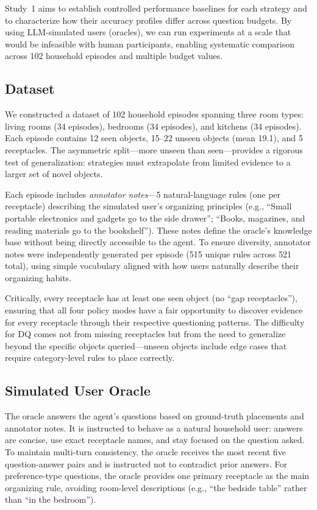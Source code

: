 \documentclass[a4paper,fleqn]{cas-sc}
\begin{document}
Study~1 aims to establish controlled performance baselines for each strategy and to characterize how their accuracy profiles differ across question budgets. By using LLM-simulated users (oracles), we can run experiments at a scale that would be infeasible with human participants, enabling systematic comparison across 102 household episodes and multiple budget values.

\subsection{Dataset}

We constructed a dataset of 102 household episodes spanning three room types: living rooms (34 episodes), bedrooms (34 episodes), and kitchens (34 episodes). Each episode contains 12 seen objects, 15--22 unseen objects (mean 19.1), and 5 receptacles. The asymmetric split---more unseen than seen---provides a rigorous test of generalization: strategies must extrapolate from limited evidence to a larger set of novel objects.

Each episode includes \emph{annotator notes}---5 natural-language rules (one per receptacle) describing the simulated user's organizing principles (e.g., ``Small portable electronics and gadgets go to the side drawer''; ``Books, magazines, and reading materials go to the bookshelf''). These notes define the oracle's knowledge base without being directly accessible to the agent. To ensure diversity, annotator notes were independently generated per episode (515 unique rules across 521 total), using simple vocabulary aligned with how users naturally describe their organizing habits.

Critically, every receptacle has at least one seen object (no ``gap receptacles''), ensuring that all four policy modes have a fair opportunity to discover evidence for every receptacle through their respective questioning patterns. The difficulty for DQ comes not from missing receptacles but from the need to generalize beyond the specific objects queried---unseen objects include edge cases that require category-level rules to place correctly.

\subsection{Simulated User Oracle}

The oracle answers the agent's questions based on ground-truth placements and annotator notes. It is instructed to behave as a natural household user: answers are concise, use exact receptacle names, and stay focused on the question asked. To maintain multi-turn consistency, the oracle receives the most recent five question-answer pairs and is instructed not to contradict prior answers. For preference-type questions, the oracle provides one primary receptacle as the main organizing rule, avoiding room-level descriptions (e.g., ``the bedside table'' rather than ``in the bedroom'').
\end{document}
